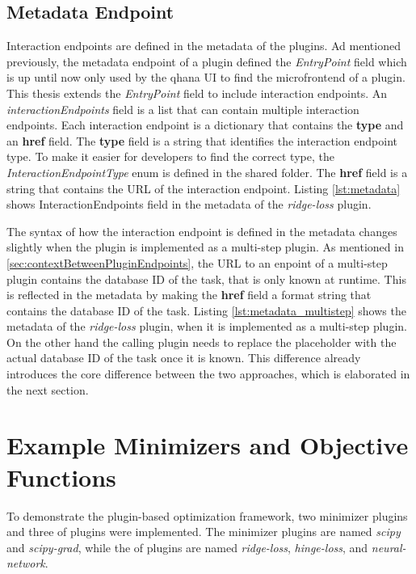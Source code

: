 \documentclass[
  a4paper,  %
  twoside,  %
  bibliography=totoc,
  headsepline,
  cleardoublepage=empty,
  parskip=half,
  draft=false
]{scrbook}
\begin{document}
\subsection{Metadata Endpoint}
\label{sec:metadataEndpoint}
Interaction endpoints are defined in the metadata of the plugins.
Ad mentioned previously, the metadata endpoint of a plugin defined the \emph{EntryPoint} field which is up until now only used by the \gls{qhana} UI to find the microfrontend of a plugin.
This thesis extends the \emph{EntryPoint} field to include interaction endpoints.
An \emph{interactionEndpoints} field is a list that can contain multiple interaction endpoints.
Each interaction endpoint is a dictionary that contains the \textbf{type} and an \textbf{href} field.
The \textbf{type} field is a string that identifies the interaction endpoint type.
To make it easier for developers to find the correct type, the \emph{InteractionEndpointType} enum is defined in the shared folder.
The \textbf{href} field is a string that contains the URL of the interaction endpoint.
Listing \ref{lst:metadata} shows InteractionEndpoints field in the metadata of the \emph{ridge-loss} plugin.


The syntax of how the interaction endpoint is defined in the metadata changes slightly when the plugin is implemented as a multi-step plugin.
As mentioned in \ref{sec:contextBetweenPluginEndpoints}, the URL to an enpoint of a multi-step plugin contains the database ID of the task, that is only known at runtime.
This is reflected in the metadata by making the \textbf{href} field a format string that contains the database ID of the task.
Listing \ref{lst:metadata_multistep} shows the metadata of the \emph{ridge-loss} plugin, when it is implemented as a multi-step plugin.
On the other hand the calling plugin needs to replace the placeholder with the actual database ID of the task once it is known.
This difference already introduces the core difference between the two approaches, which is elaborated in the next section.


\section{Example Minimizers and Objective Functions}
\label{sec:exampleMinimizersAndObjectiveFunctions}
To demonstrate the plugin-based optimization framework, two minimizer plugins and three \gls{of} plugins were implemented.
The minimizer plugins are named \emph{scipy} and \emph{scipy-grad}, while the \gls{of} plugins are named \emph{ridge-loss}, \emph{hinge-loss}, and \emph{neural-network}.
\end{document}
